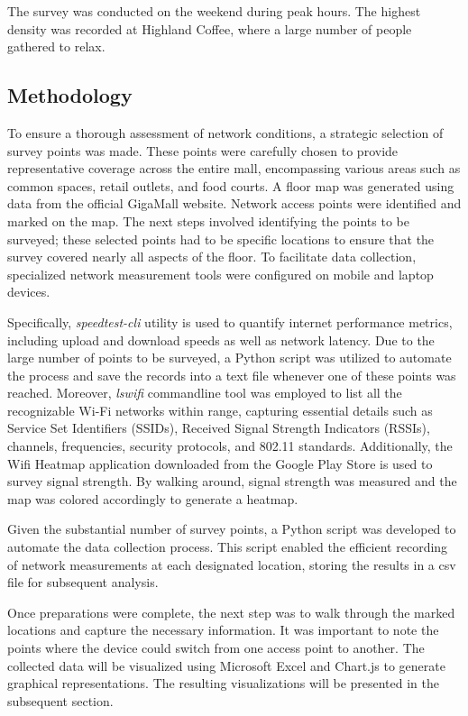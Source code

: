 \documentclass[conference]{IEEEtran}
\begin{document}
The survey was conducted on the weekend during peak hours. The highest density was recorded at Highland Coffee, where a large number of people gathered to relax.

\subsection{Methodology}

To ensure a thorough assessment of network conditions, a strategic selection of survey points was made. These points were carefully chosen to provide representative coverage across the entire mall, encompassing various areas such as common spaces, retail outlets, and food courts. A floor map was generated using data from the official GigaMall website. Network access points were identified and marked on the map. The next steps involved identifying the points to be surveyed; these selected points had to be specific locations to ensure that the survey covered nearly all aspects of the floor. To facilitate data collection, specialized network measurement tools were configured on mobile and laptop devices. 

Specifically, \textit{speedtest-cli} utility is used to quantify internet performance metrics, including upload and download speeds as well as network latency. Due to the large number of points to be surveyed, a Python script was utilized to automate the process and save the records into a text file whenever one of these points was reached. Moreover, \textit{lswifi} commandline tool was employed to list all the recognizable Wi-Fi networks within range, capturing essential details such as Service Set Identifiers (SSIDs), Received Signal Strength Indicators (RSSIs), channels, frequencies, security protocols, and 802.11 standards. Additionally, the Wifi Heatmap application downloaded from the Google Play Store is used to survey signal strength. By walking around, signal strength was measured and the map was colored accordingly to generate a heatmap.

Given the substantial number of survey points, a Python script was developed to automate the data collection process. This script enabled the efficient recording of network measurements at each designated location, storing the results in a csv file for subsequent analysis.

Once preparations were complete, the next step was to walk through the marked locations and capture the necessary information. It was important to note the points where the device could switch from one access point to another. The collected data will be visualized using Microsoft Excel and Chart.js to generate graphical representations. The resulting visualizations will be presented in the subsequent section.
\end{document}
